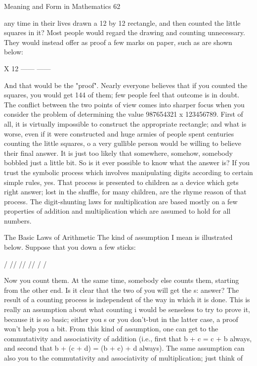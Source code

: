 Meaning and Form in Mathematics                                                           62

any time in their lives drawn a 12 by 12 rectangle, and then counted the little squares in
it? Most people would regard the drawing and counting unnecessary. They would instead
offer as proof a few marks on paper, such as are shown below:

                                                X 12
                                                ------
                                                ------


        And that would be the "proof". Nearly everyone believes that if you counted the
squares, you would get 144 of them; few people feel that outcome is in doubt.
        The conflict between the two points of view comes into sharper focus when you
consider the problem of determining the value 987654321 x 123456789. First of all, it is
virtually impossible to construct the appropriate rectangle; and what is worse, even if it
were constructed and huge armies of people spent centuries counting the little squares, o
a very gullible person would be willing to believe their final answer. It is just too likely
that somewhere, somehow, somebody bobbled just a little bit. So is it ever possible to
know what the answer is? If you trust the symbolic process which involves manipulating
digits according to certain simple rules, yes. That process is presented to children as a
device which gets right answer; lost in the shuffle, for many children, are the rhyme
reason of that process. The digit-shunting laws for multiplication are based mostly on a
few properties of addition and multiplication which are assumed to hold for all numbers.

                               The Basic Laws of Arithmetic
The kind of assumption I mean is illustrated below. Suppose that you down a few sticks:

                                    / // // // / /

Now you count them. At the same time, somebody else counts them, starting from the
other end. Is it clear that the two of you will get the s: answer? The result of a counting
process is independent of the way in which it is done. This is really an assumption about
what counting i would be senseless to try to prove it, because it is so basic; either you s or
you don't-but in the latter case, a proof won't help you a bit.
        From this kind of assumption, one can get to the commutativity and associativity
of addition (i.e., first that b + c = c + b always, and second that b + (c + d) = (b + c) + d
always). The same assumption can also you to the commutativity and associativity of
multiplication; just think of





